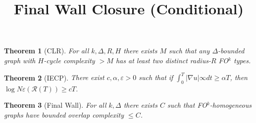\documentclass[11pt]{article}
\title{Final Wall Closure (Conditional)}
\begin{document}
\maketitle
\newtheorem{theorem}{Theorem}

\begin{theorem}[CLR]
For all $k,\Delta,R,H$ there exists $M$ such that any $\Delta$-bounded graph with $H$-cycle complexity $>M$ has at least two distinct radius-$R$ FO$^k$ types.
\end{theorem}

\begin{theorem}[IECP]
There exist $c,\alpha,\varepsilon>0$ such that if $\int_0^T |\nabla u|\infty dt \ge \alpha T$, then $\log N\varepsilon(\mathcal R(T)) \ge cT$.
\end{theorem}

\begin{theorem}[Final Wall]
For all $k,\Delta$ there exists $C$ such that FO$^k$-homogeneous graphs have bounded overlap complexity $\le C$.
\end{theorem}
\end{document}
